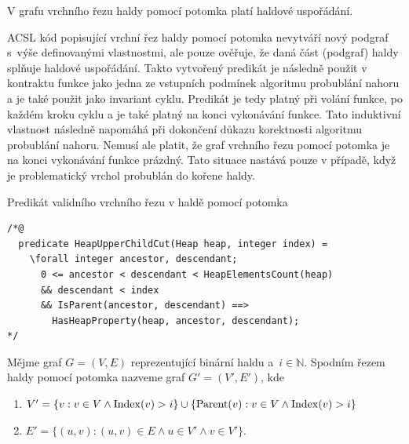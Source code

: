 \begin{remark}
	V grafu vrchního řezu haldy pomocí potomka platí haldové uspořádání.
\end{remark}

ACSL kód popisující vrchní řez haldy pomocí potomka nevytváří nový podgraf s~výše definovanými vlastnostmi, ale pouze ověřuje, že daná část (podgraf) haldy splňuje haldové uspořádání. Takto vytvořený predikát je následně použit v kontraktu funkce jako jedna ze vstupních podmínek algoritmu probublání nahoru a je také použit jako invariant cyklu. Predikát je tedy platný při volání funkce, po každém kroku cyklu a je také platný na konci vykonávání funkce. Tato induktivní vlastnost následně napomáhá při dokončení důkazu korektnosti algoritmu probublání nahoru. Nemusí ale platit, že graf vrchního řezu pomocí potomka je na konci vykonávání funkce prázdný. Tato situace nastává pouze v případě, když je problematický vrchol probublán do kořene haldy.

\begin{listing}[H]
	\caption{Predikát validního vrchního řezu v haldě pomocí potomka}
	\label{acsl:HeapUpperChildCut}
	\begin{verbatim}
/*@
  predicate HeapUpperChildCut(Heap heap, integer index) =
    \forall integer ancestor, descendant;
      0 <= ancestor < descendant < HeapElementsCount(heap)
      && descendant < index
      && IsParent(ancestor, descendant) ==>
        HasHeapProperty(heap, ancestor, descendant);
*/
	\end{verbatim}
\end{listing}

\begin{definition}
	Mějme graf $G = (V, E)$ reprezentující binární haldu a~$i \in \mathbb{N}$.
	Spodním řezem haldy pomocí potomka nazveme graf $G' = (V', E')$, kde
	\begin{enumerate}
	  \item[] $V' = \{ v: v \in V \land \operatorname{Index}(v) > i \} \cup \{ \operatorname{Parent}(v): v \in V \land \operatorname{Index}(v) > i \}$
	  \item[] $E' = \{ (u, v): (u, v) \in E \land u \in V' \land v \in V' \}$.
	\end{enumerate}
\end{definition}

